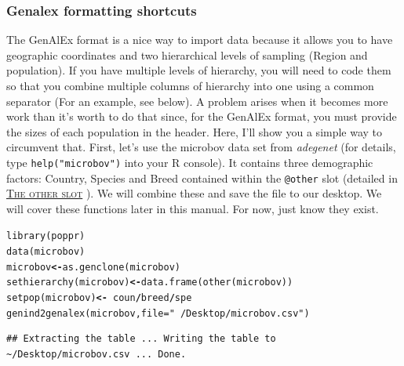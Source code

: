 \documentclass[letterpaper]{article}\usepackage[]{graphicx}\usepackage[]{color}
\makeatletter
\newcommand{\hlstr}[1]{\textcolor[rgb]{0.651,0.522,0}{#1}}%
\newcommand{\hlopt}[1]{\textcolor[rgb]{1,0,0.502}{\textbf{#1}}}%
\newcommand{\hlstd}[1]{\textcolor[rgb]{0,0,0}{#1}}%
\newcommand{\hlkwb}[1]{\textcolor[rgb]{0.502,0.502,0.753}{\textbf{#1}}}%
\newcommand{\hlkwc}[1]{\textcolor[rgb]{0,0.502,0.753}{#1}}%
\newcommand{\hlkwd}[1]{\textcolor[rgb]{0,0.267,0.4}{#1}}%
\newenvironment{kframe}{%
 \def\at@end@of@kframe{}%
 \ifinner\ifhmode%
  \def\at@end@of@kframe{\end{minipage}}%
  \begin{minipage}{\columnwidth}%
 \fi\fi%
 \def\FrameCommand##1{\hskip\@totalleftmargin \hskip-\fboxsep
 \colorbox{shadecolor}{##1}\hskip-\fboxsep
     \hskip-\linewidth \hskip-\@totalleftmargin \hskip\columnwidth}%
 \MakeFramed {\advance\hsize-\width
   \@totalleftmargin\z@ \linewidth\hsize
   \@setminipage}}%
 {\par\unskip\endMakeFramed%
 \at@end@of@kframe}
\newenvironment{knitrout}{}{} %
\newcommand{\tab}{\hspace*{1em}}
\newcommand{\seclink}[2]{
  \textsc{\hyperref[#1]{#2}}
}
\newcommand{\adegenet}{\textit{adegenet}}
\makeatother
\begin{document}
\subsubsection{Genalex formatting shortcuts}
\label{intro:import:genalex.short}

\tab\tab The GenAlEx format is a nice way to import data because it allows you to have geographic coordinates and two hierarchical levels of sampling (Region and population). If you have multiple levels of hierarchy, you will need to code them so that you combine multiple columns of hierarchy into one using a common separator (For an example, see below). A problem arises when it becomes more work than it's worth to do that since, for the GenAlEx format, you must provide the sizes of each population in the header. Here, I'll show you a simple way to circumvent that. First, let's use the microbov data set from \adegenet{} (for details, type \texttt{help("microbov")} into your R console). It contains three demographic factors: Country, Species and Breed contained within the \texttt{@other} slot (detailed in\seclink{intro:genind:other}{The other slot}). We will combine these and save the file to our desktop. We will cover these functions later in this manual. For now, just know they exist.

\begin{knitrout}\footnotesize
{}\color{fgcolor}\begin{kframe}
\begin{alltt}
\hlkwd{library}\hlstd{(poppr)}
\hlkwd{data}\hlstd{(microbov)}
\hlstd{microbov} \hlkwb{<-} \hlkwd{as.genclone}\hlstd{(microbov)}
\hlkwd{sethierarchy}\hlstd{(microbov)} \hlkwb{<-} \hlkwd{data.frame}\hlstd{(}\hlkwd{other}\hlstd{(microbov))}
\hlkwd{setpop}\hlstd{(microbov)} \hlkwb{<-} \hlopt{~}\hlstd{coun}\hlopt{/}\hlstd{breed}\hlopt{/}\hlstd{spe}
\hlkwd{genind2genalex}\hlstd{(microbov,} \hlkwc{file} \hlstd{=} \hlstr{"~/Desktop/microbov.csv"}\hlstd{)}
\end{alltt}
\end{kframe}
\end{knitrout}

\begin{knitrout}\footnotesize
{}\color{fgcolor}\begin{kframe}
\begin{verbatim}
## Extracting the table ... Writing the table to ~/Desktop/microbov.csv ... Done.
\end{verbatim}
\end{kframe}
\end{knitrout}
\end{document}
